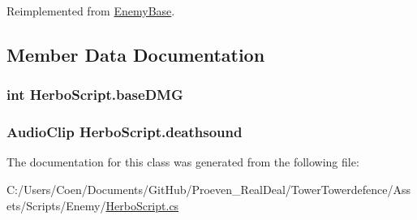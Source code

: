 Reimplemented from \hyperlink{class_enemy_base_a885f490a36e40840c886f9298ed3f2b7}{Enemy\+Base}.



\subsection{Member Data Documentation}
\subsubsection[{\texorpdfstring{base\+D\+MG}{baseDMG}}]{\setlength{\rightskip}{0pt plus 5cm}int Herbo\+Script.\+base\+D\+MG}\hypertarget{class_herbo_script_a66720a04cd35c5286239f5345b6f604c}{}\label{class_herbo_script_a66720a04cd35c5286239f5345b6f604c}
\subsubsection[{\texorpdfstring{deathsound}{deathsound}}]{\setlength{\rightskip}{0pt plus 5cm}Audio\+Clip Herbo\+Script.\+deathsound}\hypertarget{class_herbo_script_afc9a72cbd2ccd6de5e62e9285fef221c}{}\label{class_herbo_script_afc9a72cbd2ccd6de5e62e9285fef221c}


The documentation for this class was generated from the following file\+:\begin{DoxyCompactItemize}
\item 
C\+:/\+Users/\+Coen/\+Documents/\+Git\+Hub/\+Proeven\+\_\+\+Real\+Deal/\+Tower\+Towerdefence/\+Assets/\+Scripts/\+Enemy/\hyperlink{_herbo_script_8cs}{Herbo\+Script.\+cs}\end{DoxyCompactItemize}
